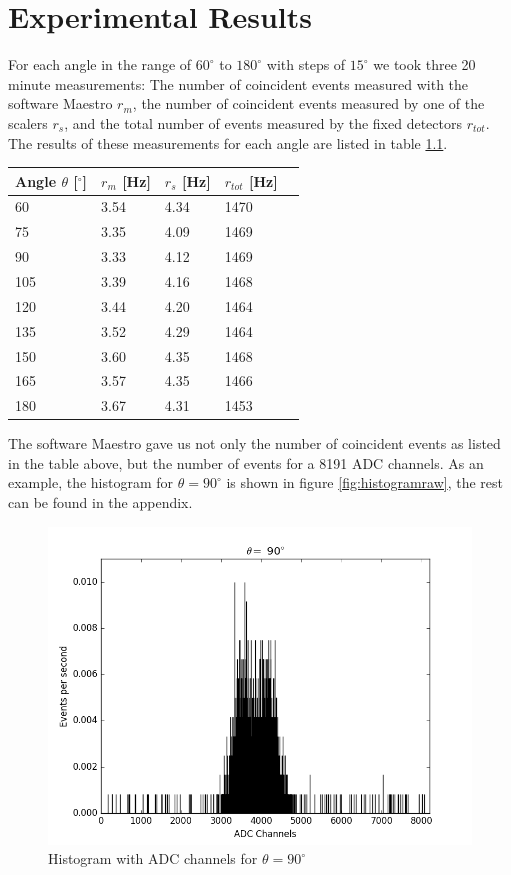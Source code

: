 \documentclass[a4paper,parskip,11pt, DIV12]{scrreprt}
\begin{document}
\chapter{Experimental Results}
For each angle in the range of $60^{\circ}$ to $180^{\circ}$ with steps of $15^{\circ}$ we took three 20 minute measurements: The number of coincident events measured with the software Maestro $r_m$, the number of coincident events measured by one of the scalers $r_s$, and the total number of events measured by the fixed detectors $r_{tot}$. The results of these measurements for each angle are listed in table \ref{tab:measurement}. 
%
\begin{table}[H]
\begin{center}
\begin{tabular}{lllll}
Angle $\theta$ [$^{\circ}$] & $r_{m}$ [Hz] & $r_{s}$ [Hz] & $r_{tot}$ [Hz]\\
\hline
60 	& 3.54 & 4.34 & 1470\\
75 	& 3.35 & 4.09 & 1469\\
90 	& 3.33 & 4.12 & 1469\\
105 	& 3.39 & 4.16 & 1468\\
120	& 3.44 & 4.20 & 1464\\
135	& 3.52 & 4.29 & 1464\\
150	& 3.60 & 4.35 & 1468\\
165	& 3.57 & 4.35 & 1466\\
180	& 3.67 & 4.31 & 1453\\ 
\end{tabular}
\label{tab:measurement}
\end{center}
\end{table}
%
The software Maestro gave us not only the number of coincident events as listed in the table above, but the number of events for a 8191 ADC channels. As an example, the histogram for $\theta = 90^{\circ}$ is shown in figure \ref{fig:histogramraw}, the rest can be found in the appendix.
%
\begin{figure}[H]
\centering
\includegraphics[scale=0.4]{90degraw.png}
\caption[Histogram]{Histogram with ADC channels for $\theta = 90^{\circ}$}
\label{fig:hist120}
\end{figure}
%
\end{document}
